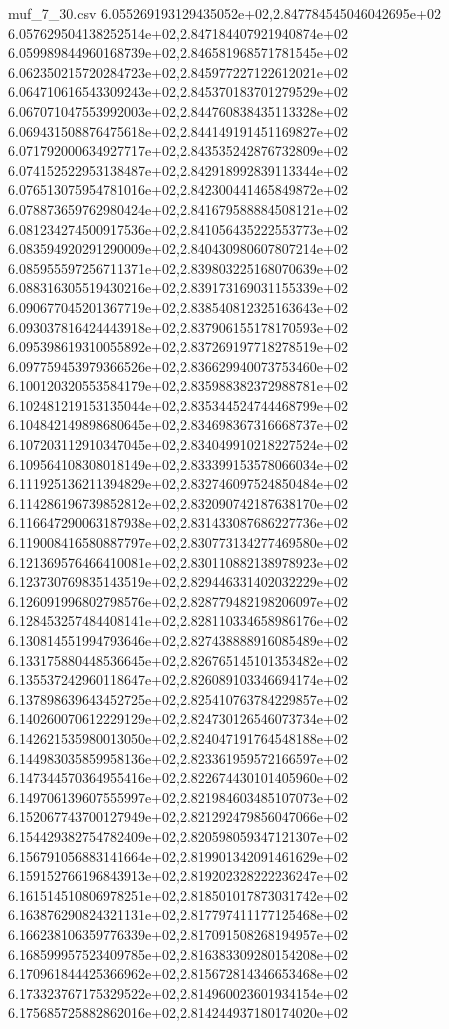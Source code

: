 \begin{filecontents*}{muf_7_30.csv}
6.055269193129435052e+02,2.847784545046042695e+02
6.057629504138252514e+02,2.847184407921940874e+02
6.059989844960168739e+02,2.846581968571781545e+02
6.062350215720284723e+02,2.845977227122612021e+02
6.064710616543309243e+02,2.845370183701279529e+02
6.067071047553992003e+02,2.844760838435113328e+02
6.069431508876475618e+02,2.844149191451169827e+02
6.071792000634927717e+02,2.843535242876732809e+02
6.074152522953138487e+02,2.842918992839113344e+02
6.076513075954781016e+02,2.842300441465849872e+02
6.078873659762980424e+02,2.841679588884508121e+02
6.081234274500917536e+02,2.841056435222553773e+02
6.083594920291290009e+02,2.840430980607807214e+02
6.085955597256711371e+02,2.839803225168070639e+02
6.088316305519430216e+02,2.839173169031155339e+02
6.090677045201367719e+02,2.838540812325163643e+02
6.093037816424443918e+02,2.837906155178170593e+02
6.095398619310055892e+02,2.837269197718278519e+02
6.097759453979366526e+02,2.836629940073753460e+02
6.100120320553584179e+02,2.835988382372988781e+02
6.102481219153135044e+02,2.835344524744468799e+02
6.104842149898680645e+02,2.834698367316668737e+02
6.107203112910347045e+02,2.834049910218227524e+02
6.109564108308018149e+02,2.833399153578066034e+02
6.111925136211394829e+02,2.832746097524850484e+02
6.114286196739852812e+02,2.832090742187638170e+02
6.116647290063187938e+02,2.831433087686227736e+02
6.119008416580887797e+02,2.830773134277469580e+02
6.121369576466410081e+02,2.830110882138978923e+02
6.123730769835143519e+02,2.829446331402032229e+02
6.126091996802798576e+02,2.828779482198206097e+02
6.128453257484408141e+02,2.828110334658986176e+02
6.130814551994793646e+02,2.827438888916085489e+02
6.133175880448536645e+02,2.826765145101353482e+02
6.135537242960118647e+02,2.826089103346694174e+02
6.137898639643452725e+02,2.825410763784229857e+02
6.140260070612229129e+02,2.824730126546073734e+02
6.142621535980013050e+02,2.824047191764548188e+02
6.144983035859958136e+02,2.823361959572166597e+02
6.147344570364955416e+02,2.822674430101405960e+02
6.149706139607555997e+02,2.821984603485107073e+02
6.152067743700127949e+02,2.821292479856047066e+02
6.154429382754782409e+02,2.820598059347121307e+02
6.156791056883141664e+02,2.819901342091461629e+02
6.159152766196843913e+02,2.819202328222236247e+02
6.161514510806978251e+02,2.818501017873031742e+02
6.163876290824321131e+02,2.817797411177125468e+02
6.166238106359776339e+02,2.817091508268194957e+02
6.168599957523409785e+02,2.816383309280154208e+02
6.170961844425366962e+02,2.815672814346653468e+02
6.173323767175329522e+02,2.814960023601934154e+02
6.175685725882862016e+02,2.814244937180174020e+02

\end{filecontents*}

